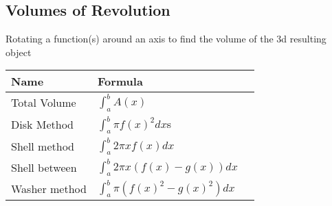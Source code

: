 \documentclass[17pt]{extarticle}
\begin{document}
\subsection{Volumes of Revolution}
Rotating a function(s) around an axis to find the volume of the 3d resulting object
\renewcommand{\arraystretch}{2}
\begin{table}[H]
\begin{tabular}{|l|l|l|}
\hline
\rowcolor{githublightgray}
Name & Formula\\
\hline
Total Volume & $\int_{a}^{b}A(x)$\\
\hline
Disk Method &$\int_{a}^{b}\pi f(x)^2dx$s\\
\hline
Shell method &$\int_{a}^{b}2\pi xf(x)dx$\\
\hline
Shell between &$\int_{a}^{b}2\pi x(f(x)-g(x))dx$\\
\hline
Washer method &$\int_{a}^{b}\pi(f(x)^2-g(x)^2)dx$\\
\hline
\end{tabular}
\end{table}
\end{document}
